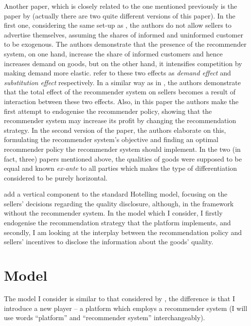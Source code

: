 \documentclass[a4paper]{article}
\begin{document}
	
Another paper, which is closely related to the one mentioned previously is the paper by \cite{li2018recommender} (actually there are two quite different versions of this paper). In the first one, considering the same set-up as \cite{chen2016advertising}, the authors do not allow sellers to advertise themselves, assuming the shares of informed and uninformed customer to be exogenous. The authors demonstrate that the presence of the recommender system, on one hand, increase the share of informed customers and hence increases demand on goods, but on the other hand, it intensifies competition by making demand more elastic. \cite{li2018recommender} refer to these two effects as \textit{demand effect} and \textit{substitution effect} respectively. In a similar way as in \cite{chen2016advertising}, the authors demonstrate that the total effect of the recommender system on sellers becomes a result of interaction between these two effects. Also, in this paper the authors make the first attempt to endogenise the recommender policy, showing that the recommender system may increase its profit by changing the recommendation strategy. In the second version of the paper, the authors elaborate on this, formulating the recommender system's objective and finding an optimal recommender policy the recommender system should implement. In the two (in fact, three) papers mentioned above, the qualities of goods were supposed to be equal and known \textit{ex-ante} to all parties which makes the type of differentiation considered to be purely horizontal.
	
\cite{levin2009quality} add a vertical component to the standard Hotelling model, focusing on the sellers' decisions regarding the quality disclosure, although, in the framework without the recommender system. In the model which I consider, I firstly endogenise the recommendation strategy that the platform implements, and secondly, I am looking at the interplay between the recommendation policy and sellers' incentives to disclose the information about the goods' quality.	
	\section{Model}
The model I consider is similar to that considered by \cite{levin2009quality}, the difference is that I introduce a new player -- a platform which employs a recommender system (I will use words ``platform'' and ``recommender system'' interchangeably).
		
\end{document}

